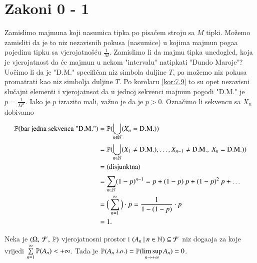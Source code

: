 
\chapter{Zakoni 0 - 1}  \label{zakoni_01}

\begin{pr}  \label{pr:9.1}
    Zamislimo majmuna koji nasumica tipka po pisa\' cem stroju sa $M$ tipki.
    Mo\v zemo zamisliti da je to niz nezavisnih pokusa (nasumice) u kojima majmun poga\dj a pojedinu tipku sa vjerojatno\v s\' cu $\frac{1}{M}$.
    Zamislimo li da majmu tipka unedogled, koja je vjerojatnost da \' ce majmun u nekom "intervalu" natipkati "Dundo Maroje"?
    Uo\v cimo li da je "D.M." specifi\v can niz simbola duljine $T$, pa mo\v zemo niz pokusa promatrati kao niz simbolja duljine $T$.
    Po korolaru \ref{kor:7.9} to su opet nezavisni slu\v cajni elementi i vjerojatnsot da u jednoj sekvenci majmun pogodi "D.M." je $p = \frac{1}{M^T}$.
    Iako je $p$ izrazito mali, va\v zno je da je $p > 0$.
    Ozna\v cimo li sekvencu sa $X_n$ dobivamo
    \begin{equation*}
        \begin{aligned}
            \mathbb{P}({\textnormal{bar jedna sekvenca "D.M."}})
            &= \mathbb{P}({\bigcup\limits_{n \in \mathbb{N}}^{} (X_n = \textnormal{D.M.})})\\
            &= \mathbb{P}({\bigcup\limits_{n \in \mathbb{N}}^{} (X_1 \neq \textnormal{D.M.}), \ldots, X_{n-1} \neq \textnormal{D.M.}, \: X_n = \textnormal{D.M.})})\\
            &= \textnormal{(disjunktna)}\\
            &= \sum\limits_{n \in \mathbb{N}}^{} (1 - p)^{n - 1} = p + (1 - p) \: p + (1 - p)^2 \: p + \ldots\\
            &= \Big( \sum\limits_{n = 1}^{\infty} \Big) \cdot p = \frac{1}{1 - (1 - p)} \cdot p\\
            &= 1.
        \end{aligned}
    \end{equation*}
\end{pr}

\begin{lm}  \label{lm:9.2}
    Neka je $(\Omega, \: \mathcal{F}, \: \mathbb{P})$ vjerojatnosni prostor i $({A_n} \: | \: {n \in \mathbb{N}}) \subseteq \mathcal{F}$ niz doga\dj aja za koje vrijedi $\sum\limits_{n = 1}^{\infty} \mathbb{P}({A_n}) < +\infty$.
    Tada je $\mathbb{P}({A_n \; i.o.}) = \mathbb{P}({\limsup\limits_{n \to +\infty} A_n}) = 0$.
\end{lm}

